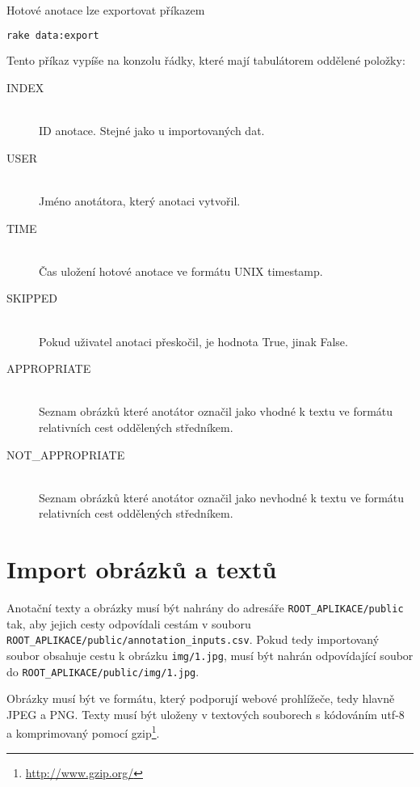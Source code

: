 Hotové anotace lze exportovat příkazem

\begin{lstlisting}[language=bash]
rake data:export
\end{lstlisting}

Tento příkaz vypíše na konzolu řádky, které mají tabulátorem oddělené položky:

\begin{description}

\item[INDEX] \hfill \\
  ID anotace. Stejné jako u importovaných dat.
\item[USER] \hfill \\
  Jméno anotátora, který anotaci vytvořil.
\item[TIME] \hfill \\
  Čas uložení hotové anotace ve formátu UNIX timestamp.
\item[SKIPPED] \hfill \\
  Pokud uživatel anotaci přeskočil, je hodnota True, jinak False.
\item[APPROPRIATE] \hfill \\
  Seznam obrázků které anotátor označil jako vhodné k textu ve formátu relativních cest oddělených středníkem.
\item[NOT\_APPROPRIATE] \hfill \\
  Seznam obrázků které anotátor označil jako nevhodné k textu ve formátu relativních cest oddělených středníkem.

\end{description}

\section{Import obrázků a textů}

Anotační texty a obrázky musí být nahrány do adresáře \lstinline{ROOT_APLIKACE/public} tak, aby jejich cesty odpovídali cestám v souboru \\ \lstinline{ROOT_APLIKACE/public/annotation_inputs.csv}. Pokud tedy importovaný soubor obsahuje cestu k obrázku \lstinline{img/1.jpg}, musí být nahrán odpovídající soubor do \lstinline{ROOT_APLIKACE/public/img/1.jpg}.

Obrázky musí být ve formátu, který podporují webové prohlížeče, tedy hlavně JPEG a PNG. Texty musí být uloženy v textových souborech s kódováním utf-8 a komprimovaný pomocí gzip\footnote{\url{http://www.gzip.org/}}.

